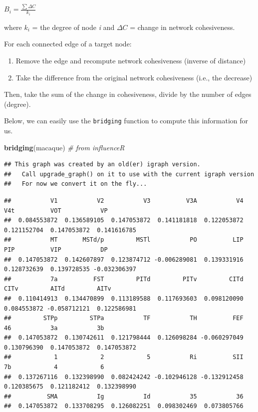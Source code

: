 \documentclass[
]{book}
\newenvironment{Shaded}{\begin{snugshade}}{\end{snugshade}}
\newcommand{\CommentTok}[1]{\textcolor[rgb]{0.56,0.35,0.01}{\textit{#1}}}
\newcommand{\FunctionTok}[1]{\textcolor[rgb]{0.13,0.29,0.53}{\textbf{#1}}}
\newcommand{\NormalTok}[1]{#1}
\providecommand{\tightlist}{%
  \setlength{\itemsep}{0pt}\setlength{\parskip}{0pt}}
\begin{document}
\(B_i=\frac{∑ΔC}{k_i}\)

where \(k_i\) = the degree of node \emph{i} and \(ΔC\) = change in network cohesiveness.

For each connected edge of a target node:

\begin{enumerate}
\def\labelenumi{\arabic{enumi}.}
\tightlist
\item
  Remove the edge and recompute network cohesiveness (inverse of distance)
\item
  Take the difference from the original network cohesiveness (i.e., the decrease)
\end{enumerate}

Then, take the sum of the change in cohesiveness, divide by the number of edges (degree).

Below, we can easily use the \texttt{bridging} function to compute this information for us.

\begin{Shaded}
\begin{Highlighting}[]
\FunctionTok{bridging}\NormalTok{(macaque) }\CommentTok{\# from influenceR}
\end{Highlighting}
\end{Shaded}

\begin{verbatim}
## This graph was created by an old(er) igraph version.
##   Call upgrade_graph() on it to use with the current igraph version
##   For now we convert it on the fly...
\end{verbatim}

\begin{verbatim}
##           V1           V2           V3          V3A           V4          V4t          VOT           VP 
##  0.084553872  0.136589105  0.147053872  0.141181818  0.122053872  0.121152704  0.147053872  0.141616785 
##           MT       MSTd/p         MSTl           PO          LIP          PIP          VIP           DP 
##  0.147053872  0.142607897  0.123874712 -0.006289081  0.139331916  0.128732639  0.139728535 -0.032306397 
##           7a          FST         PITd         PITv         CITd         CITv         AITd         AITv 
##  0.110414913  0.134470899  0.113189588  0.117693603  0.098120090  0.084553872 -0.058712121  0.122586981 
##         STPp         STPa           TF           TH          FEF           46           3a           3b 
##  0.147053872  0.130742611  0.121798444  0.126098284 -0.060297049  0.130796390  0.147053872  0.147053872 
##            1            2            5           Ri          SII           7b            4            6 
##  0.137267116  0.132398990  0.082424242 -0.102946128 -0.132912458  0.120385675  0.121182412  0.132398990 
##          SMA           Ig           Id           35           36 
##  0.147053872  0.133708295  0.126082251  0.098302469  0.073805766
\end{verbatim}
\end{document}
